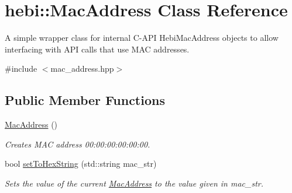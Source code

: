\hypertarget{classhebi_1_1MacAddress}{}\section{hebi\+:\+:Mac\+Address Class Reference}
\label{classhebi_1_1MacAddress}


A simple wrapper class for internal C-\/\+A\+PI Hebi\+Mac\+Address objects to allow interfacing with A\+PI calls that use M\+AC addresses.  




{\ttfamily \#include $<$mac\+\_\+address.\+hpp$>$}

\subsection*{Public Member Functions}
\begin{DoxyCompactItemize}
\item 
\mbox{\label{classhebi_1_1MacAddress_a5d943aac7186bba333a443e84e26aacd}} 
\hyperlink{classhebi_1_1MacAddress_a5d943aac7186bba333a443e84e26aacd}{Mac\+Address} ()
\begin{DoxyCompactList}\small\item\em Creates M\+AC address 00\+:00\+:00\+:00\+:00\+:00. \end{DoxyCompactList}\item 
bool \hyperlink{classhebi_1_1MacAddress_a3e661d4efb84ca1743f5fe6acfd8ed8c}{set\+To\+Hex\+String} (std\+::string mac\+\_\+str)
\begin{DoxyCompactList}\small\item\em Sets the value of the current \hyperlink{classhebi_1_1MacAddress}{Mac\+Address} to the value given in \textquotesingle{}mac\+\_\+str\textquotesingle{}. \end{DoxyCompactList}\end{DoxyCompactItemize}
